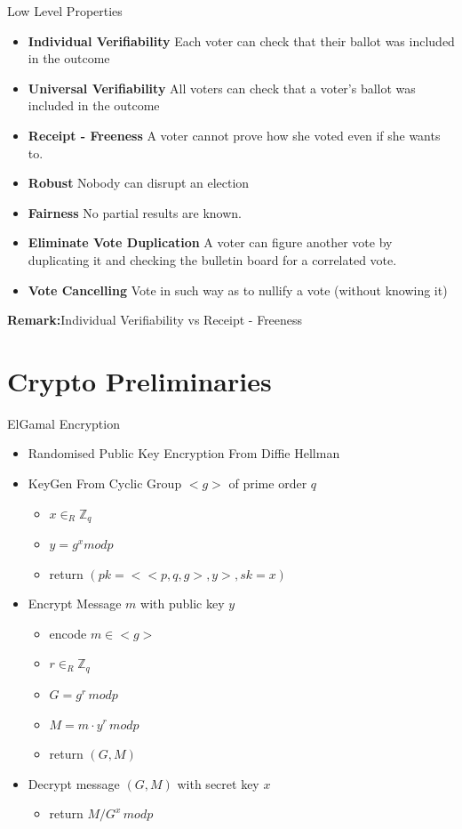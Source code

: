\documentclass{beamer}
\begin{document}
\begin{frame}{Low Level Properties \cite{Riv6897}}
\begin{itemize}
\item \textbf{Individual Verifiability} Each voter can check that their ballot was included in the outcome
\item \textbf{Universal Verifiability} All voters can check that a voter's ballot was included in the outcome
\item \textbf{Receipt - Freeness} A voter cannot prove how she voted even if she wants to.
\item \textbf{Robust} Nobody can disrupt an election
\item \textbf{Fairness} No partial results are known.
\item \textbf{Eliminate Vote Duplication} A voter can figure another vote by duplicating it and checking the bulletin board for a correlated vote.
\item \textbf{Vote Cancelling} Vote in such way as to nullify a vote (without knowing it)
\end{itemize}
\textbf{Remark:}Individual Verifiability vs Receipt - Freeness
\end{frame}

\section{Crypto Preliminaries}

\begin{frame}{ElGamal Encryption}
\begin{itemize}
\item Randomised Public Key Encryption From Diffie Hellman 
\item KeyGen From Cyclic Group $<g>$ of prime order $q$
\begin{itemize}
\item  $ x \in_R \mathbb{Z}_q $
\item  $ y = g^x mod p $
\item  return $ (pk = <<p,q,g>,y>, sk = x)$
\end{itemize}
\item Encrypt Message $m$ with public key $y$
\begin{itemize}
\item  encode $m \in <g>$
\item  $r \in_R \mathbb{Z}_q$
\item  $G = g^r \, mod p$
\item  $M = m \cdot y^r \, mod p$
\item  return $(G,M)$
\end{itemize}
\item Decrypt message $(G,M)$ with secret key $x$
\begin{itemize}
\item  return $M/G^x \, mod p$
\end{itemize}
\end{itemize}
\end{frame}
\end{document}
